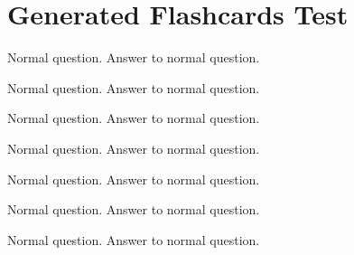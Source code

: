 \documentclass{../../flashcards}
\begin{document}
\section{Generated Flashcards Test}

\begin{card}{Normal question.}
Answer to normal question.
\end{card}


\begin{card}{\blindtext[4]}
\blindtext[4]
\end{card}


\begin{card}{Normal question.}
Answer to normal question.
\end{card}


\begin{card}{\blindtext[4]}
\blindtext[4]
\end{card}


\begin{card}{Normal question.}
Answer to normal question.
\end{card}


\begin{card}{\blindtext[4]}
\blindtext[4]
\end{card}


\begin{card}{Normal question.}
Answer to normal question.
\end{card}


\begin{card}{\blindtext[4]}
\blindtext[4]
\end{card}


\begin{card}{Normal question.}
Answer to normal question.
\end{card}


\begin{card}{\blindtext[4]}
\blindtext[4]
\end{card}


\begin{card}{Normal question.}
Answer to normal question.
\end{card}


\begin{card}{\blindtext[4]}
\blindtext[4]
\end{card}


\begin{card}{Normal question.}
Answer to normal question.
\end{card}
\end{document}
